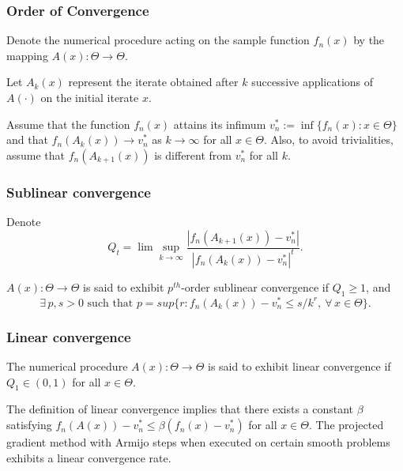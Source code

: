 \documentclass[usepdftitle=false, aspectratio=169]{beamer}
\begin{document}
\begin{frame}
\frametitle{Order of Convergence}

Denote the numerical procedure acting on the sample function $f_n(x)$ by the mapping
$A(x) : \Theta \rightarrow \Theta$.

\mbox{}

Let $A_k(x)$ represent the iterate obtained after $k$ successive applications
of $A(\cdot)$ on the initial iterate $x$.

\mbox{}

Assume that the function $f_n(x)$ attains its infimum $v_n^{*} := \inf\{ f_n(x) : x \in \Theta\}$ and
that $f_n (A_k (x)) \rightarrow v_n^{*}$ as $k \rightarrow \infty$ for all $x \in \Theta$.
Also, to avoid trivialities, assume that
$f_n (A_{k+1} (x))$ is different from $v_n^*$ for all $k$.

\end{frame}

\begin{frame}
\frametitle{Sublinear convergence}

Denote
$$
Q_t = \lim \sup_{k \rightarrow \infty} \frac{ | f_n(A_{k+1} (x)) - v_n^* |}
{| f_n (A_k (x)) - v_n^* |^t}.
$$

\mbox{}

\begin{definition}
$A(x) : \Theta \rightarrow \Theta$ is said to exhibit $p^{th}$-order
sublinear convergence if $Q_1 \geq 1$, and
$$
\exists\,p, s > 0 \text{ such that } p = sup \{r : f_n(A_k (x)) - v^*_n \leq s/k^r,\ \forall\, x \in \Theta\}.
$$
\end{definition}

\end{frame}

\begin{frame}
\frametitle{Linear convergence}

\begin{definition}
The numerical procedure $A(x) : \Theta \rightarrow \Theta$ is said to exhibit linear convergence if $Q_1 \in (0, 1)$ for all $x \in \Theta$.
\end{definition}

\mbox{}

The definition of linear convergence implies that there exists a constant $\beta$ satisfying $f_n ( A (x)) - v_n^* \leq \beta (f_n(x) - v_n^*)$ for all $x \in \Theta$.
The projected gradient method with Armijo steps when executed on certain smooth problems exhibits a linear convergence rate.

\end{frame}
\end{document}
